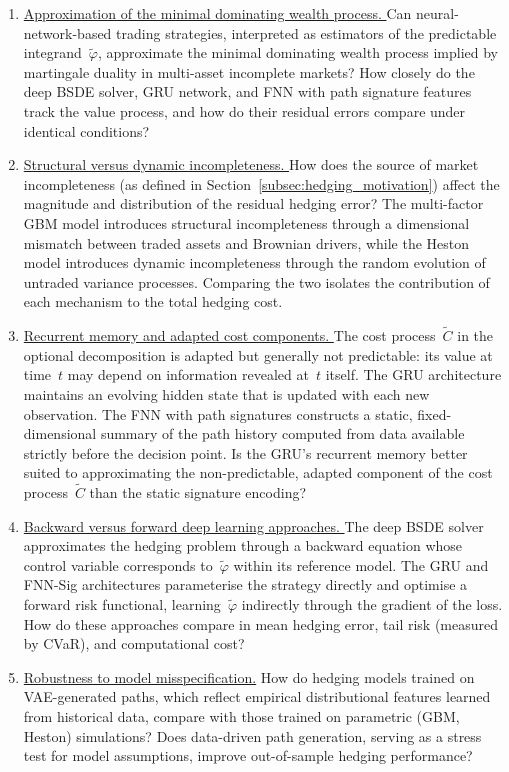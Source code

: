 \begin{enumerate}
\item \underline{Approximation of the minimal dominating wealth process. }
  Can neural-network-based trading strategies, interpreted as estimators
  of the predictable integrand~$\tilde{\varphi}$, approximate the minimal
  dominating wealth process implied by martingale duality in multi-asset
  incomplete markets? How closely do the deep BSDE solver, GRU network,
  and FNN with path signature features track the value process, and how
  do their residual errors compare under identical conditions?

\item \underline{Structural versus dynamic incompleteness. }
  How does the source of market incompleteness
  (as defined in Section~\ref{subsec:hedging_motivation}) affect the
  magnitude and distribution of the residual hedging error? The
  multi-factor GBM model introduces structural incompleteness through a
  dimensional mismatch between traded assets and Brownian drivers, while
  the Heston model introduces dynamic incompleteness through the random
  evolution of untraded variance processes. Comparing the two isolates
  the contribution of each mechanism to the total hedging cost.

\item \underline{Recurrent memory and adapted cost components. }
  The cost process~$\tilde{C}$ in the optional decomposition is adapted
  but generally not predictable: its value at time~$t$ may depend on
  information revealed at~$t$ itself. The GRU architecture maintains an
  evolving hidden state that is updated with each new observation. The
  FNN with path signatures constructs a static, fixed-dimensional summary
  of the path history computed from data available strictly before the
  decision point. Is the GRU's recurrent memory better suited to
  approximating the non-predictable, adapted component of the cost
  process~$\tilde{C}$ than the static signature encoding?

\item \underline{Backward versus forward deep learning approaches. }
  The deep BSDE solver approximates the hedging problem through a
  backward equation whose control variable corresponds
  to~$\tilde{\varphi}$ within its reference model. The GRU and FNN-Sig
  architectures parameterise the strategy directly and optimise a forward
  risk functional, learning~$\tilde{\varphi}$ indirectly through the
  gradient of the loss. How do these approaches compare in mean hedging
  error, tail risk (measured by CVaR), and computational cost?

\item \underline{Robustness to model misspecification.} 
  How do hedging models trained on VAE-generated paths, which reflect
  empirical distributional features learned from historical data, compare
  with those trained on parametric (GBM, Heston) simulations? Does
  data-driven path generation, serving as a stress test for model
  assumptions, improve out-of-sample hedging performance?
\end{enumerate}


